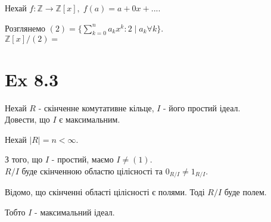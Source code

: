 \documentclass[11pt, a4paper]{article} %
\newcommand{\Z}{\mathbb{Z}}
\begin{document}
Нехай $f : \Z \to \Z[x], \; f(a) = a + 0x + ...$.

Розглянемо $(2) = \{\sum_{k=0}^n a_kx^k : 2 \mid a_k \forall k\}$.\\
$\Z[x]/(2) = $


\section*{Ex 8.3}
\begin{mdframed}
    Нехай $R$ - скінченне комутативне кільце, $I$ - його простий ідеал.\\
    Довести, що $I$ є максимальним.
\end{mdframed}

Нехай $|R| = n < \infty$. 

З того, що $I$ - простий, маємо $I \ne (1)$.\\
$R/I$ буде скінченною областю цілісності та $0_{R/I} \ne 1_{R/I}$.

    


Відомо, що скінченні області цілісності є полями. 
Тоді $R/I$ буде полем.

Тобто $I$ - максимальний ідеал.
\end{document}
